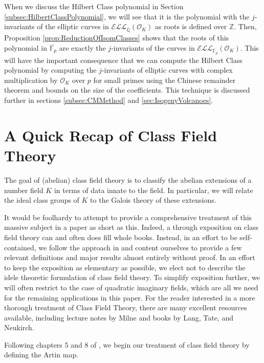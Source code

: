\documentclass{amsart}
\theoremstyle{definition}
\theoremstyle{remark}
\numberwithin{equation}{section}
\newcommand{\cE}{\mathcal E}
\newcommand{\cL}{\mathcal L}
\newcommand{\cO}{\mathcal O}
\newcommand{\bbF}{\mathbb F}
\newcommand{\bbQ}{\mathbb Q}
\newcommand{\bbZ}{\mathbb Z}
\newcommand{\ELL}{\cE\cL\cL}
\begin{document}
When we discuss the Hilbert Class polynomial in Section \ref{subsec:HilbertClassPolynomial},
 we will see that it is the polynomial with the $j$-invariants of the elliptic curves in $\ELL_{\overline{\bbQ}}(\cO_{K})$ as roots is defined over $\bbZ$. Then, Proposition \ref{prop:ReductionOfIsomClasses} shows that the roots of this polynomial in $\overline{\bbF_{p}}$ are exactly the $j$-invariants of the curves in $\ELL_{\overline{\bbF_{p}}}(\cO_{K})$. This will have the important consequence that we can compute the Hilbert Class polynomial by computing the $j$-invariants of elliptic curves with complex multiplication by $\cO_{K}$ over $p$ for small primes using the Chinese remainder theorem and bounds on the size of the coefficients. This technique is discussed further in sections \ref{subsec:CMMethod} and \ref{sec:IsogenyVolcanoes}.

\section{A Quick Recap of Class Field Theory} \label{sec:CFT}

  The goal of (abelian) class field theory is to classify the abelian extensions of a number field $K$ in terms of data innate to the field. In particular, we will relate the ideal class groups of $K$ to the Galois theory of these extensions.
    
  It would be foolhardy to attempt to provide a comprehensive treatment of this massive subject in a paper as short as this. Indeed, a through exposition on class field theory can and often does fill whole books. Instead, in an effort to be self-contained, we follow the approach in \cite{CoxPrimes, LangEF, SilvermanATAEC} and content ourselves to provide a few relevant definitions and major results almost entirely without proof. In an effort to keep the exposition as elementary as possible, we elect not to describe the idele theoretic formulation of class field theory. To simplify exposition further, we will often restrict to the case of quadratic imaginary fields, which are all we need for the remaining applications in this paper. For the reader interested in a more thorough treatment of Class Field Theory, there are many excellent resources available, including lecture notes by Milne and books by Lang, Tate, and Neukirch.

 Following chapters 5 and 8 of \cite{CoxPrimes}, we begin our treatment of class field theory by defining the Artin map. 
 
\end{document}

